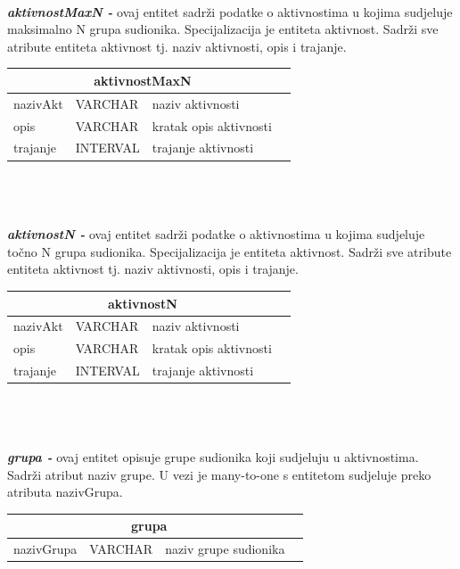 \\
\textbf{\textit{aktivnostMaxN -}} ovaj entitet sadrži podatke o aktivnostima u kojima sudjeluje maksimalno N grupa sudionika. Specijalizacija je entiteta aktivnost. Sadrži sve atribute entiteta aktivnost tj. naziv aktivnosti, opis i trajanje.\\
\begin{tabular}{|l|l|l|l|}
	
	\hline \multicolumn{3}{|c|}{\textbf{aktivnostMaxN}}	\\  \hline
	
	\cellcolor{aquamarine}nazivAkt & VARCHAR	&  	naziv aktivnosti\\ \hline
	opis	&	VARCHAR	&	kratak opis aktivnosti\\ \hline
	trajanje & INTERVAL & trajanje aktivnosti\\ \hline 
\end{tabular} \\ \\
\\
\textbf{\textit{aktivnostN -}} ovaj entitet  sadrži podatke o aktivnostima u kojima sudjeluje točno N grupa sudionika. Specijalizacija je entiteta aktivnost. Sadrži sve atribute entiteta aktivnost tj. naziv aktivnosti, opis i trajanje.\\
\begin{tabular}{|l|l|l|l|}
	
	\hline \multicolumn{3}{|c|}{\textbf{aktivnostN}}\\	 \hline
	
	\cellcolor{aquamarine}nazivAkt & VARCHAR	&  	naziv aktivnosti\\ \hline
	opis	&	VARCHAR	&	kratak opis aktivnosti\\ \hline
	trajanje & INTERVAL & trajanje aktivnosti\\ \hline 
\end{tabular} \\ \\
\\
\textbf{\textit{grupa -}} ovaj entitet opisuje grupe sudionika koji sudjeluju u aktivnostima. Sadrži atribut naziv grupe. U vezi je many-to-one s entitetom sudjeluje preko atributa nazivGrupa. \\
\begin{tabular}{|l|l|l|l|}
	
	\hline \multicolumn{3}{|c|}{\textbf{grupa}}	\\  \hline
	
	\cellcolor{aquamarine}nazivGrupa & VARCHAR	&  	naziv grupe sudionika\\ \hline 
\end{tabular} \\ \\
